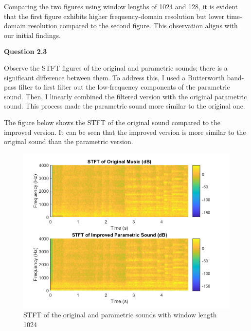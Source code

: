\documentclass[journal,12pt,onecolumn,draftclsnofoot]{IEEEtran}
\begin{document}
        Comparing the two figures using window lengths of 1024 and 128, it is evident that the first figure exhibits higher frequency-domain resolution but 
        lower time-domain resolution compared to the second figure. This observation aligns with our initial findings.
        \newpage
        
    \noindent \textbf{Question 2.3}

        Observe the STFT figures of the original and parametric sounds; there is a significant difference between them. 
        To address this, I used a Butterworth band-pass filter to first filter out the low-frequency components of the parametric sound. 
        Then, I linearly combined the filtered version with the original parametric sound. This process made the parametric sound more similar to the original one.

        The figure below shows the STFT of the original sound compared to the improved version. 
        It can be seen that the improved version is more similar to the original sound than the parametric version.

        \begin{figure}[H]
            \centering
                \includegraphics[width=0.7\linewidth]{figures/STFT result improved.png}
            \caption{STFT of the original and parametric sounds with window length 1024}
            \label{fig:STFT result 1024}
        \end{figure}

        
\end{document}
